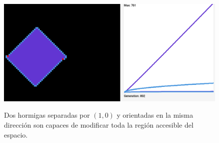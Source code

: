 \documentclass[12pt,twoside]{article}
\begin{document}
\begin{figure}[h!]
	\centering
	\begin{minipage}{0.45\textwidth}
	\centering
	\includegraphics[width=1.4\textwidth]{img/2rl_1.png}
\end{minipage}%
\vspace{0.3cm}

\begin{minipage}{0.9\textwidth}
	\centering
	\small Dos hormigas separadas por $(1, 0)$ y orientadas en la misma dirección son capaces de modificar toda la región accesible del espacio. 
\end{minipage}
\vspace{0.5cm}
\end{figure}
\end{document}

